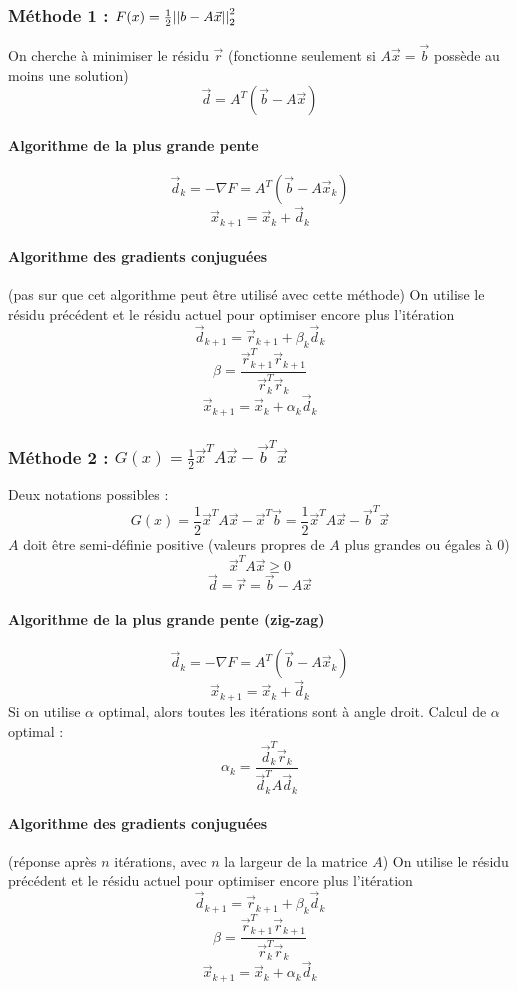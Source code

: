 \documentclass[resume]{subfiles}
\begin{document}
\subsubsection{Méthode 1 : $F(x)=\frac{1}{2}\abs{\abs{b-A\vec{x}}}^2_2$}
On cherche à minimiser le résidu $\vec{r}$ (fonctionne seulement si $A\vec{x}=\vec{b}$ possède au moins une solution)
$$\vec{d}=A^T(\vec{b}-A\vec{x})$$
\paragraph{Algorithme de la plus grande pente}
$$\vec{d}_k=-\nabla F=A^T(\vec{b}-A\vec{x}_k)$$
$$\vec{x}_{k+1}=\vec{x}_k+\vec{d}_k$$
\paragraph{Algorithme des gradients conjuguées} (pas sur que cet algorithme peut être utilisé avec cette méthode)
On utilise le résidu précédent et le résidu actuel pour optimiser encore plus l'itération
$$\vec{d}_{k+1}=\vec{r}_{k+1}+\beta_k\vec{d}_k$$
$$\beta=\frac{\vec{r}_{k+1}^T\vec{r}_{k+1}}{\vec{r}_k^T\vec{r}_k}$$
$$\vec{x}_{k+1}=\vec{x}_{k}+\alpha_k\vec{d}_k$$


\subsubsection{Méthode 2 : $G(x)=\frac{1}{2}\vec{x}^TA\vec{x}-\vec{b}^T\vec{x}$}
Deux notations possibles :
$$G(x)=\frac{1}{2}\vec{x}^TA\vec{x}-\vec{x}^T\vec{b}=\frac{1}{2}\vec{x}^TA\vec{x}-\vec{b}^T\vec{x}$$
$A$ doit être semi-définie positive (valeurs propres de $A$ plus grandes ou égales à 0)
$$\vec{x}^TA\vec{x}\geq 0$$
$$\vec{d}=\vec{r}=\vec{b}-A\vec{x}$$
\paragraph{Algorithme de la plus grande pente (zig-zag)}
$$\vec{d}_k=-\nabla F=A^T(\vec{b}-A\vec{x}_k)$$
$$\vec{x}_{k+1}=\vec{x}_k+\vec{d}_k$$
Si on utilise $\alpha$ optimal, alors toutes les itérations sont à angle droit. Calcul de $\alpha$ optimal :
$$\alpha_k=\frac{\vec{d}_k^T\vec{r}_k}{\vec{d}^T_kA\vec{d}_k}$$
\paragraph{Algorithme des gradients conjuguées} (réponse après $n$ itérations, avec $n$ la largeur de la matrice $A$)
On utilise le résidu précédent et le résidu actuel pour optimiser encore plus l'itération
$$\vec{d}_{k+1}=\vec{r}_{k+1}+\beta_k\vec{d}_k$$
$$\beta=\frac{\vec{r}_{k+1}^T\vec{r}_{k+1}}{\vec{r}_k^T\vec{r}_k}$$
$$\vec{x}_{k+1}=\vec{x}_{k}+\alpha_k\vec{d}_k$$

    


    
\end{document}
